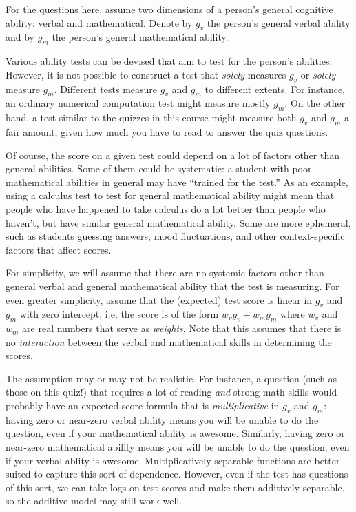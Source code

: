 \documentclass[10pt]{amsart}
\begin{document}
\vspace{0.5in}

For the questions here, assume two dimensions of a person's general
cognitive ability: verbal and mathematical. Denote by $g_v$ the
person's general verbal ability and by $g_m$ the person's general
mathematical ability.

Various ability tests can be devised that aim to test for the person's
abilities. However, it is not possible to construct a test that {\em
  solely} measures $g_v$ or {\em solely} measure $g_m$. Different
tests measure $g_v$ and $g_m$ to different extents. For instance, an
ordinary numerical computation test might measure mostly $g_m$. On the
other hand, a test similar to the quizzes in this course might measure
both $g_v$ and $g_m$ a fair amount, given how much you have to read to
answer the quiz questions.

Of course, the score on a given test could depend on a lot of factors
other than general abilities. Some of them could be systematic: a
student with poor mathematical abilities in general may have ``trained
for the test.'' As an example, using a calculus test to test for
general mathematical ability might mean that people who have happened
to take calculus do a lot better than people who haven't, but have
similar general mathematical ability. Some are more ephemeral, such as
students guessing answers, mood fluctuations, and other
context-specific factors that affect scores.

For simplicity, we will assume that there are no systemic factors
other than general verbal and general mathematical ability that the
test is measuring. For even greater simplicity, assume that the
(expected) test score is linear in $g_v$ and $g_m$ with zero
intercept, i.e, the score is of the form $w_vg_v + w_mg_m$ where $w_v$
and $w_m$ are real numbers that serve as {\em weights}. Note that this
assumes that there is no {\em interaction} between the verbal and
mathematical skills in determining the scores.

The assumption may or may not be realistic. For instance, a question
(such as those on this quiz!) that requires a lot of reading {\em and}
strong math skills would probably have an expected score formula that
is {\em multiplicative} in $g_v$ and $g_m$: having zero or near-zero
verbal ability means you will be unable to do the question, even if
your mathematical ability is awesome. Similarly, having zero or
near-zero mathematical ability means you will be unable to do the
question, even if your verbal ablity is awesome. Multiplicatively
separable functions are better suited to capture this sort of
dependence. However, even if the test has questions of this sort, we
can take logs on test scores and make them additively separable, so
the additive model may still work well.
\end{document}
